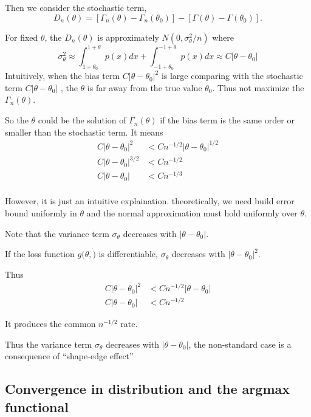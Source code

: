 Then we consider the stochastic term,
$$
D_n(\theta)=\left[\Gamma_n(\theta)-\Gamma_n\left(\theta_0\right)\right]-\left[\Gamma(\theta)-\Gamma\left(\theta_0\right)\right] .
$$

For fixed $\theta$,
the $D_n(\theta)$ is approximately $N(0,\sigma^2_\theta/n)$
where
$$
\sigma_\theta^2 \approx \int_{1+\theta_0}^{1+\theta} p(x) d x+\int_{-1+\theta_0}^{-1+\theta} p(x) d x \approx C\left|\theta-\theta_0\right|
$$
Intuitively, when the bias term $C|\theta - \theta_0|^2$  is large comparing with the stochastic term $C|\theta - \theta_0|$ , the $\theta$ is far away from the true value $\theta_0$.
Thus not maximize the $\Gamma_n(\theta)$.

So the $\theta$ could be the solution of $\Gamma_n(\theta)$ if the bias term is the same order or smaller than the stochastic term.
It means 
\begin{align*}
  C|\theta - \theta_0|^2 &< C n^{-1/2}|\theta - \theta_0|^{1/2} \\
  C|\theta - \theta_0|^{3/2} &< C n^{-1/2} \\
  C|\theta - \theta_0| &< C n^{-1/3} \\
\end{align*}

\begin{summary}
  However, it is just an intuitive explaination.
  theoretically, we need build error bound uniformly in $\theta$ and the normal approximation must hold uniformly over $\theta$.
\end{summary}

Note that the variance term $\sigma_\theta$ decreases with $|\theta - \theta_0|$.

If the loss function $g(\theta,\dot)$ is differentiable, 
$\sigma_\theta$ decreases with $|\theta - \theta_0|^2$.
 
Thus
\begin{align*}
  C|\theta - \theta_0|^2 &< C n^{-1/2}|\theta - \theta_0| \\
  C|\theta - \theta_0| &< C n^{-1/2}
\end{align*}

It produces the common $n^{-1/2}$ rate.

Thus the  variance term $\sigma_\theta$ decreases with $|\theta - \theta_0|$, the non-standard case is a consequence of ``shape-edge effect''


\subsection{Convergence in distribution and the argmax functional}

